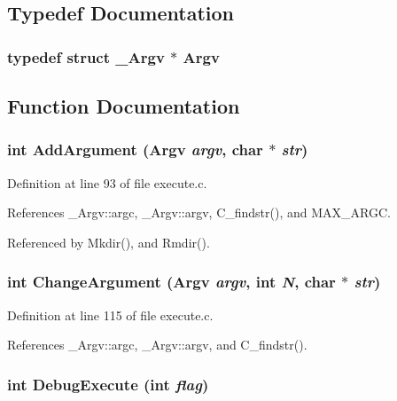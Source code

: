 \subsection{Typedef Documentation}
\subsubsection{\setlength{\rightskip}{0pt plus 5cm}typedef struct \bf{\_\-Argv} $\ast$ \bf{Argv}}\label{execute_8h_5e2238ea60840cd78abff47f6ff6a5ec}




\subsection{Function Documentation}
\subsubsection{\setlength{\rightskip}{0pt plus 5cm}int Add\-Argument (\bf{Argv} {\em argv}, char $\ast$ {\em str})}\label{execute_8h_630bbf2b20fe58ee74d72b041eb668f3}




Definition at line 93 of file execute.c.

References \_\-Argv::argc, \_\-Argv::argv, C\_\-findstr(), and MAX\_\-ARGC.

Referenced by Mkdir(), and Rmdir().
\subsubsection{\setlength{\rightskip}{0pt plus 5cm}int Change\-Argument (\bf{Argv} {\em argv}, int {\em N}, char $\ast$ {\em str})}\label{execute_8h_17a9d9f0557f51e462e8e1171e8359b0}




Definition at line 115 of file execute.c.

References \_\-Argv::argc, \_\-Argv::argv, and C\_\-findstr().
\subsubsection{\setlength{\rightskip}{0pt plus 5cm}int Debug\-Execute (int {\em flag})}\label{execute_8h_fb4d111c8bfb81eec580bdd25f7c9f69}




